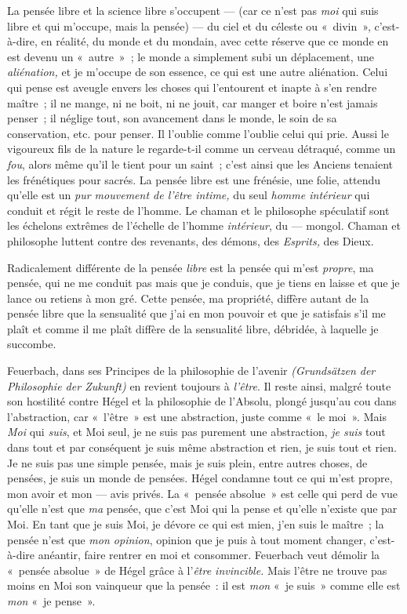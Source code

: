 \documentclass[french,twoside]{book} %
\begin{document}
La pensée libre et la science libre s’occupent — (car ce n’est pas \emph{moi} qui suis libre et qui m’occupe, mais la pensée) — du ciel et du céleste ou « divin », c’est-à-dire, en réalité, du monde et du mondain, avec cette réserve que ce monde en est devenu un « autre » ; le monde a simplement subi un déplacement, une \emph{aliénation,} et je m’occupe de son essence, ce qui est une autre aliénation. Celui qui pense est aveugle envers les choses qui l’entourent et inapte à s’en rendre maître ; il ne mange, ni ne boit, ni ne jouit, car manger et boire n’est jamais penser ; il néglige tout, son avancement dans le monde, le soin de sa conservation, etc. pour penser. Il l’oublie comme l’oublie celui qui prie. Aussi le vigoureux fils de la nature le regarde-t-il comme un cerveau détraqué, comme un \emph{fou}, alors même qu’il le tient pour un saint ; c’est ainsi que les Anciens tenaient les frénétiques pour sacrés. La pensée libre est une frénésie, une folie, attendu qu’elle est un \emph{pur mouvement de l’être intime, }du seul \emph{homme intérieur} qui conduit et régit le reste de l’homme. Le chaman et le philosophe spéculatif sont les échelons extrêmes de l’échelle de l’homme \emph{intérieur}, du — mongol. Chaman et philosophe luttent contre des revenants, des démons, des \emph{Esprits, }des Dieux.\par
Radicalement différente de la pensée \emph{libre} est la pensée qui m’est \emph{propre}, ma pensée, qui ne me conduit pas mais que je conduis, que je tiens en laisse et que je lance ou retiens à mon gré. Cette pensée, ma propriété, diffère autant de la pensée libre que la sensualité que j’ai en mon pouvoir et que je satisfais s’il me plaît et comme il me plaît diffère de la sensualité libre, débridée, à laquelle je succombe.\par
Feuerbach, dans ses Principes de la philosophie de l’avenir \emph{(Grundsätzen der Philosophie der Zukunft)} en revient toujours à \emph{l’être}. Il reste ainsi, malgré toute  son hostilité contre Hégel et la philosophie de l’Absolu, plongé jusqu’au cou dans l’abstraction, car « l’être » est une abstraction, juste comme « le moi ». Mais \emph{Moi} qui \emph{suis}, et Moi seul, je ne suis pas purement une abstraction, \emph{je suis} tout dans tout et par conséquent je suis même abstraction et rien, je suis tout et rien. Je ne suis pas une simple pensée, mais je suis plein, entre autres choses, de pensées, je suis un monde de pensées. Hégel condamne tout ce qui m’est propre, mon avoir et mon — avis privés. La « pensée absolue » est celle qui perd de vue qu’elle n’est que \emph{ma} pensée, que c’est Moi qui la pense et qu’elle n’existe que par Moi. En tant que je suis Moi, je dévore ce qui est mien, j’en suis le maître ; la pensée n’est que \emph{mon opinion}, opinion que je puis à tout moment changer, c’est-à-dire anéantir, faire rentrer en moi et consommer. Feuerbach veut démolir la « pensée absolue » de Hégel grâce à l’\emph{être invincible.} Mais l’être ne trouve pas moins en Moi son vainqueur que la pensée : il est \emph{mon} « je suis » comme elle est \emph{mon} « je pense ».\par
\end{document}
